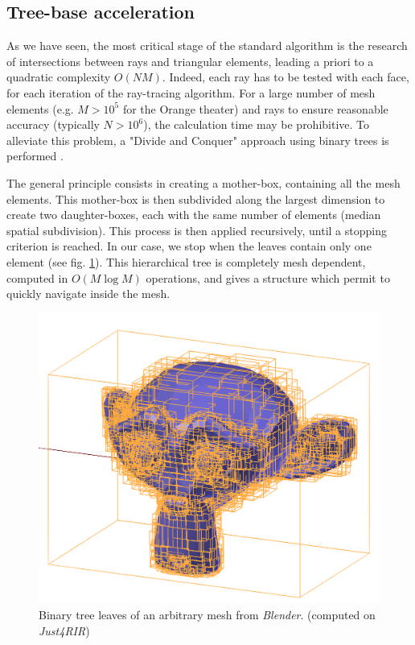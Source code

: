 \documentclass{aes2e}
\begin{document}
\subsection{Tree-base acceleration}
\label{octree}
As we have seen, the most critical stage of the standard algorithm is the research of intersections between  rays and triangular elements, leading a priori to a quadratic complexity $O(N M)$. Indeed, each ray has to be tested with each face, for each iteration of the ray-tracing algorithm. For a large number of mesh elements (e.g. $M>10^5$ for the Orange theater) and rays to ensure reasonable accuracy (typically $N>10^6$), the calculation time may be prohibitive. To alleviate this problem, a "Divide and Conquer" approach using binary trees is performed \cite{fft} \cite{matrix}. 

The general principle consists in creating a mother-box, containing all the mesh elements. This mother-box is then subdivided along the largest dimension to create two daughter-boxes, each with the same number of elements (median spatial subdivision). This process is then applied recursively, until a stopping criterion is reached. In our case, we stop when the leaves contain only one element (see fig. \ref{octreeSuzanne}). This hierarchical tree is completely mesh dependent, computed in $O(M\log M)$ operations, and gives a structure which permit to quickly navigate inside the mesh. 
\begin{figure}[t]
\centering
		\includegraphics[width=0.8\linewidth]{octreeSuzanne}
		\caption{Binary tree leaves of an arbitrary mesh from \textit{Blender}. (computed on \textit{Just4RIR})}
		\label{octreeSuzanne}
\end{figure}
\end{document}
